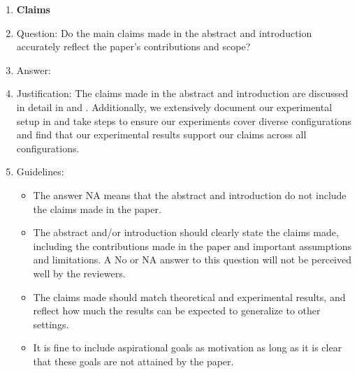 \documentclass{article}
\begin{document}
\begin{enumerate}

\item {\bf Claims}
    \item[] Question: Do the main claims made in the abstract and introduction accurately reflect the paper's contributions and scope?
    \item[] Answer: \answerYes{} %
    \item[] Justification: The claims made in the abstract and introduction are discussed in detail in  and . Additionally, we extensively document our experimental setup in  and take steps to ensure our experiments cover diverse configurations and find that our experimental results support our claims across all configurations.
    \item[] Guidelines:
    \begin{itemize}
        \item The answer NA means that the abstract and introduction do not include the claims made in the paper.
        \item The abstract and/or introduction should clearly state the claims made, including the contributions made in the paper and important assumptions and limitations. A No or NA answer to this question will not be perceived well by the reviewers. 
        \item The claims made should match theoretical and experimental results, and reflect how much the results can be expected to generalize to other settings. 
        \item It is fine to include aspirational goals as motivation as long as it is clear that these goals are not attained by the paper. 
    \end{itemize}


\end{enumerate}
\end{document}
